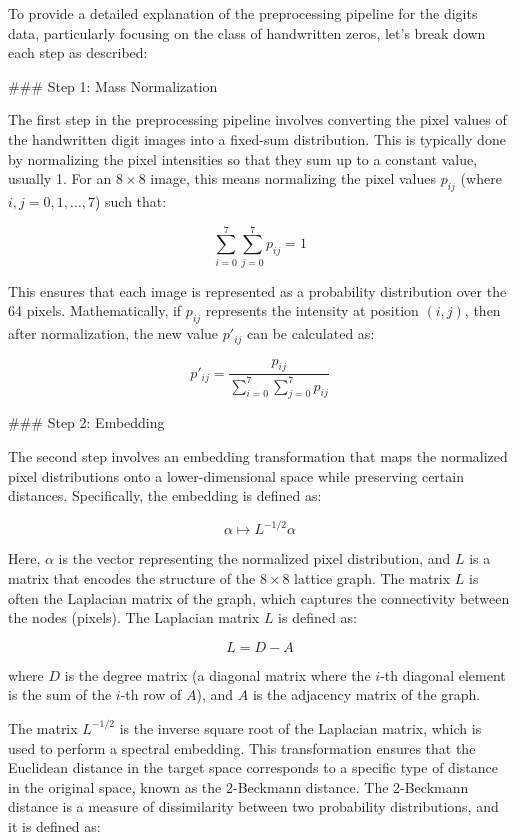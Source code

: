 To provide a detailed explanation of the preprocessing pipeline for the digits data, particularly focusing on the class of handwritten zeros, let's break down each step as described:

### Step 1: Mass Normalization

The first step in the preprocessing pipeline involves converting the pixel values of the handwritten digit images into a fixed-sum distribution. This is typically done by normalizing the pixel intensities so that they sum up to a constant value, usually 1. For an \(8 \times 8\) image, this means normalizing the pixel values \(p_{ij}\) (where \(i, j = 0, 1, \ldots, 7\)) such that:

\[
\sum_{i=0}^{7} \sum_{j=0}^{7} p_{ij} = 1
\]

This ensures that each image is represented as a probability distribution over the 64 pixels. Mathematically, if \(p_{ij}\) represents the intensity at position \((i, j)\), then after normalization, the new value \(p'_{ij}\) can be calculated as:

\[
p'_{ij} = \frac{p_{ij}}{\sum_{i=0}^{7} \sum_{j=0}^{7} p_{ij}}
\]

### Step 2: Embedding

The second step involves an embedding transformation that maps the normalized pixel distributions onto a lower-dimensional space while preserving certain distances. Specifically, the embedding is defined as:

\[
\alpha \mapsto L^{-1/2} \alpha
\]

Here, \(\alpha\) is the vector representing the normalized pixel distribution, and \(L\) is a matrix that encodes the structure of the \(8 \times 8\) lattice graph. The matrix \(L\) is often the Laplacian matrix of the graph, which captures the connectivity between the nodes (pixels). The Laplacian matrix \(L\) is defined as:

\[
L = D - A
\]

where \(D\) is the degree matrix (a diagonal matrix where the \(i\)-th diagonal element is the sum of the \(i\)-th row of \(A\)), and \(A\) is the adjacency matrix of the graph.

The matrix \(L^{-1/2}\) is the inverse square root of the Laplacian matrix, which is used to perform a spectral embedding. This transformation ensures that the Euclidean distance in the target space corresponds to a specific type of distance in the original space, known as the 2-Beckmann distance. The 2-Beckmann distance is a measure of dissimilarity between two probability distributions, and it is defined as:

